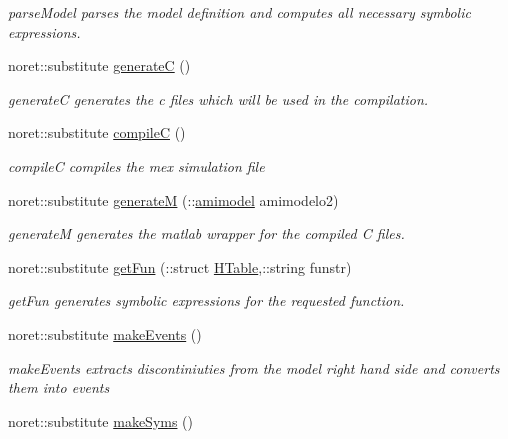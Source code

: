 \begin{DoxyCompactItemize}
\begin{DoxyCompactList}\small\item\em parse\+Model parses the model definition and computes all necessary symbolic expressions. \end{DoxyCompactList}\item 
noret\+::substitute \hyperlink{classamimodel_a73df9b3d523823e7a0105916471f13f5}{generate\+C} ()
\begin{DoxyCompactList}\small\item\em generate\+C generates the c files which will be used in the compilation. \end{DoxyCompactList}\item 
noret\+::substitute \hyperlink{classamimodel_abf720a0c3104977029538e3b19d429bb}{compile\+C} ()
\begin{DoxyCompactList}\small\item\em compile\+C compiles the mex simulation file \end{DoxyCompactList}\item 
noret\+::substitute \hyperlink{classamimodel_a6e93ea24824d9d90c322960e6d78fed0}{generate\+M} (\+::\hyperlink{classamimodel}{amimodel} amimodelo2)
\begin{DoxyCompactList}\small\item\em generate\+M generates the matlab wrapper for the compiled C files. \end{DoxyCompactList}\item 
noret\+::substitute \hyperlink{classamimodel_a08d58ae650e5ff9310760f6d3f08015c}{get\+Fun} (\+::struct \hyperlink{classamimodel_aafe6335df413dd688a2f44efba012cf1}{H\+Table},\+::string funstr)
\begin{DoxyCompactList}\small\item\em get\+Fun generates symbolic expressions for the requested function. \end{DoxyCompactList}\item 
\hypertarget{classamimodel_a4d4b20c81af6d7ed977b6b818c7b22db}{}noret\+::substitute \hyperlink{classamimodel_a4d4b20c81af6d7ed977b6b818c7b22db}{make\+Events} ()\label{classamimodel_a4d4b20c81af6d7ed977b6b818c7b22db}

\begin{DoxyCompactList}\small\item\em make\+Events extracts discontiniuties from the model right hand side and converts them into events \end{DoxyCompactList}\item 
\hypertarget{classamimodel_a5aba9155145df4b3f70bfec887c25af9}{}noret\+::substitute \hyperlink{classamimodel_a5aba9155145df4b3f70bfec887c25af9}{make\+Syms} ()\label{classamimodel_a5aba9155145df4b3f70bfec887c25af9}


\end{DoxyCompactItemize}
